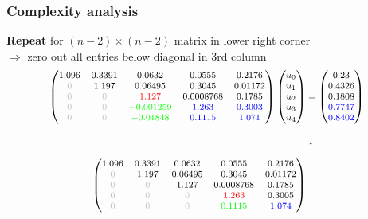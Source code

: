 \documentclass{beamer}
\begin{document}
\begin{frame}[fragile]
  \frametitle{Complexity analysis}
  \textbf{Repeat} for $(n-2)\times (n-2)$ matrix in lower right corner\\
  $\Rightarrow$ zero out all entries below diagonal in 3rd column
  $$
{\footnotesize
\begin{aligned}
    \begin{pmatrix}
1.096 & 0.3391 & 0.0632 & 0.0555 & 0.2176\\
\textcolor{lightgray}{0} & 1.197 & 0.06495 & 0.3045 & 0.01172\\
\textcolor{lightgray}{0} & \textcolor{lightgray}{0} & \textcolor{red}{1.127} & \textcolor{black}{0.0008768} & \textcolor{black}{0.1785}\\
\textcolor{lightgray}{0} & \textcolor{lightgray}{0} & \textcolor{green}{-0.001259} & \textcolor{blue}{1.263} & \textcolor{blue}{0.3003}\\
\textcolor{lightgray}{0} & \textcolor{lightgray}{0} & \textcolor{green}{-0.01848} & \textcolor{blue}{0.1115} & \textcolor{blue}{1.071}
\end{pmatrix}
\begin{pmatrix}
u_0 \\ u_1 \\ u_2 \\ u_3 \\ u_4
\end{pmatrix}
&=
    \begin{pmatrix}
0.23\\
0.4326\\
\textcolor{black}{0.1808}\\
\textcolor{blue}{0.7747}\\
\textcolor{blue}{0.8402}
\end{pmatrix}\\[2ex]
&\downarrow\\[2ex]
    \begin{pmatrix}
1.096 & 0.3391 & 0.0632 & 0.0555 & 0.2176\\
\textcolor{lightgray}{0} & 1.197 & 0.06495 & 0.3045 & 0.01172\\
\textcolor{lightgray}{0} & \textcolor{lightgray}{0} & 1.127 & 0.0008768 & 0.1785\\
\textcolor{lightgray}{0} & \textcolor{lightgray}{0} & \textcolor{lightgray}{0} & \textcolor{red}{1.263} & \textcolor{black}{0.3005}\\
\textcolor{lightgray}{0} & \textcolor{lightgray}{0} & \textcolor{lightgray}{0} & \textcolor{green}{0.1115} & \textcolor{blue}{1.074}

\end{pmatrix}
\end{aligned}}$$
\end{frame}
\end{document}
